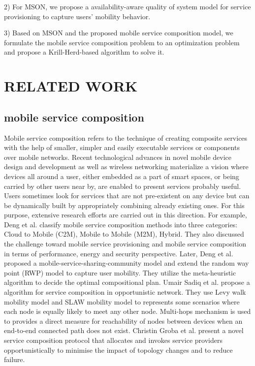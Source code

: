 \documentclass[journal]{IEEEtran}
\begin{document}
2) For MSON, we propose a availability-aware quality of system model for service provisioning to capture users' mobility behavior.

3) Based on MSON and the proposed mobile service composition model, we formulate the mobile service composition problem to an optimization problem and propose a Krill-Herd-based algorithm to solve it. 


\section{RELATED WORK}

\subsection{mobile service composition}
Mobile service composition refers to the technique of creating composite services with the help of smaller, simpler and easily executable services or components over mobile networks. Recent technological advances in novel mobile device design and development as well as wireless networking materialize a vision where devices all around a user, either embedded as a part of smart spaces, or being carried by other users
near by, are enabled to present services probably useful. Users sometimes look for services that are not pre-existent on any device but can be dynamically built by appropriately combining already existing ones. For this purpose, extensive research efforts are carried out in this direction. 
For example, Deng et al. \cite{Deng2016} classify mobile service composition methods into three categories: Cloud to Mobile (C2M), Mobile to Mobile (M2M), Hybrid. They also discussed the challenge toward mobile service provisioning and mobile service composition in terms of performance, energy and security perspective. 
Later, Deng et al. \cite{Deng2017} proposed a mobile-service-sharing-community model and extend the random way point (RWP) model to capture user mobility. They utilize the meta-heuristic algorithm to decide the optimal compositional plan. 
Umair Sadiq et al. \cite{sadiq2015service} propose a algorithm for service composition in opportunistic network. They use Levy walk mobility model and SLAW mobility model to represents some scenarios where each node is equally likely to meet any other node. Multi-hops mechanism is used to provides a direct measure for reachability of nodes between devices when an end-to-end connected path does not exist.
Christin Groba et al. \cite{groba2014opportunistic} present a novel service composition protocol that allocates and invokes service providers opportunistically to minimise the impact of topology changes and to reduce failure.
\end{document}
